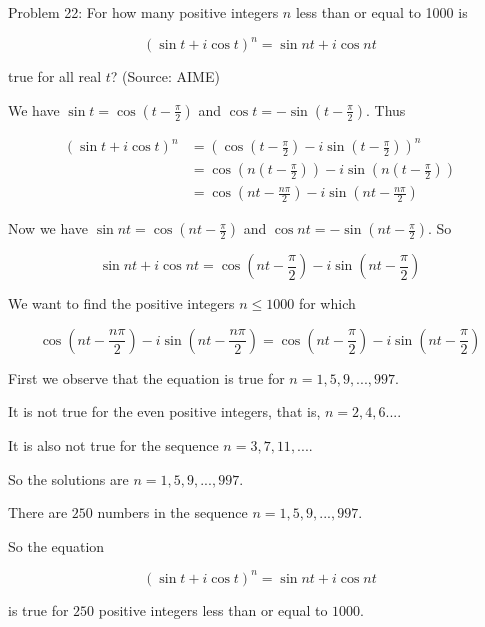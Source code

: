 Problem 22: For how many positive integers $n$ less than or equal to 1000 is

\[(\sin t + i \cos t)^n = \sin nt + i \cos nt\]

true for all real $t$? (Source: AIME)

We have $\sin t = \cos(t - \frac{\pi}{2})$ and $\cos t = - \sin(t - \frac{\pi}{2})$. Thus

\begin{align*}
(\sin t + i \cos t)^n &= (\cos(t - \frac{\pi}{2}) - i \sin(t - \frac{\pi}{2}))^n \\
&= \cos(n(t - \frac{\pi}{2})) - i \sin(n(t - \frac{\pi}{2})) \\
&= \cos(nt - \frac{n\pi}{2}) - i \sin(nt - \frac{n\pi}{2})
\end{align*}

Now we have $\sin nt = \cos (nt - \frac{\pi}{2})$ and $\cos nt = - \sin(nt - \frac{\pi}{2})$. So

$$ \sin nt + i \cos nt = \cos (nt - \frac{\pi}{2}) - i \sin(nt - \frac{\pi}{2}) $$

We want to find the positive integers $n \leq 1000$ for which

$$ \cos(nt - \frac{n\pi}{2}) - i \sin(nt - \frac{n\pi}{2}) = \cos (nt - \frac{\pi}{2}) - i \sin(nt - \frac{\pi}{2}) $$

First we observe that the equation is true for $n = 1, 5, 9, ..., 997$.

It is not true for the even positive integers, that is, $n = 2, 4, 6...$.

It is also not true for the sequence $n = 3, 7, 11, ... $.

So the solutions are $n = 1, 5, 9, ..., 997$.

There are $250$ numbers in the sequence $n = 1, 5, 9, ..., 997$.

So the equation

\[ (\sin t + i \cos t)^n = \sin nt + i \cos nt\]

is true for $\boxed{250}$ positive integers less than or equal to $1000$.
